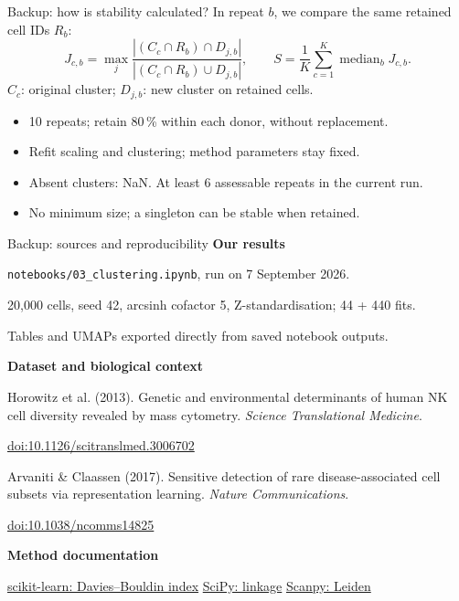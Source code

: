 \begin{frame}{Backup: how is stability calculated?}
  \small
  In repeat $b$, we compare the same retained cell IDs $R_b$:
  \[
    J_{c,b}=\max_j\frac{|(C_c\cap R_b)\cap D_{j,b}|}{|(C_c\cap R_b)\cup D_{j,b}|},
    \qquad S=\frac{1}{K}\sum_{c=1}^{K}\operatorname{median}_b J_{c,b}.
  \]
  $C_c$: original cluster; $D_{j,b}$: new cluster on retained cells.
  \begin{itemize}
    \item 10 repeats; retain 80\,\% within each donor, without replacement.
    \item Refit scaling and clustering; method parameters stay fixed.
    \item Absent clusters: NaN. At least 6 assessable repeats in the current run.
    \item No minimum size; a singleton can be stable when retained.
  \end{itemize}
\end{frame}

\begin{frame}{Backup: sources and reproducibility}
  \footnotesize
  \textbf{Our results}\par
  \texttt{notebooks/03\_clustering.ipynb}, run on 7 September 2026.\par
  20,000 cells, seed 42, arcsinh cofactor 5, Z-standardisation; 44 + 440 fits.\par
  Tables and UMAPs exported directly from saved notebook outputs.
  \vspace{3mm}

  \textbf{Dataset and biological context}\par
  Horowitz et al. (2013). Genetic and environmental determinants of human NK cell diversity revealed by mass cytometry. \emph{Science Translational Medicine}.\par
  \href{https://doi.org/10.1126/scitranslmed.3006702}{doi:10.1126/scitranslmed.3006702}\par
  Arvaniti \& Claassen (2017). Sensitive detection of rare disease-associated cell subsets via representation learning. \emph{Nature Communications}.\par
  \href{https://doi.org/10.1038/ncomms14825}{doi:10.1038/ncomms14825}
  \vspace{3mm}

  \textbf{Method documentation}\par
  \href{https://scikit-learn.org/stable/modules/clustering.html\#davies-bouldin-index}{scikit-learn: Davies--Bouldin index}\quad
  \href{https://docs.scipy.org/doc/scipy/reference/generated/scipy.cluster.hierarchy.linkage.html}{SciPy: linkage}\quad
  \href{https://scanpy.readthedocs.io/en/stable/api/generated/scanpy.tl.leiden.html}{Scanpy: Leiden}
\end{frame}
